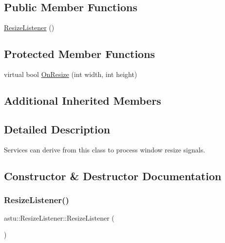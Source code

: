 \subsection*{Public Member Functions}
\begin{DoxyCompactItemize}
\item 
\hyperlink{classastu_1_1ResizeListener_ae98cd9c37d7919043b9552d98475efd0}{Resize\+Listener} ()
\end{DoxyCompactItemize}
\subsection*{Protected Member Functions}
\begin{DoxyCompactItemize}
\item 
virtual bool \hyperlink{classastu_1_1ResizeListener_a34f14538388fdd36713cd1097dcf5fb1}{On\+Resize} (int width, int height)
\end{DoxyCompactItemize}
\subsection*{Additional Inherited Members}


\subsection{Detailed Description}
Services can derive from this class to process window resize signals. 

\subsection{Constructor \& Destructor Documentation}
\mbox{\label{classastu_1_1ResizeListener_ae98cd9c37d7919043b9552d98475efd0}} 
\subsubsection{\texorpdfstring{Resize\+Listener()}{ResizeListener()}}
{\footnotesize\ttfamily astu\+::\+Resize\+Listener\+::\+Resize\+Listener (\begin{DoxyParamCaption}{ }\end{DoxyParamCaption})\hspace{0.3cm}{\ttfamily [inline]}}

